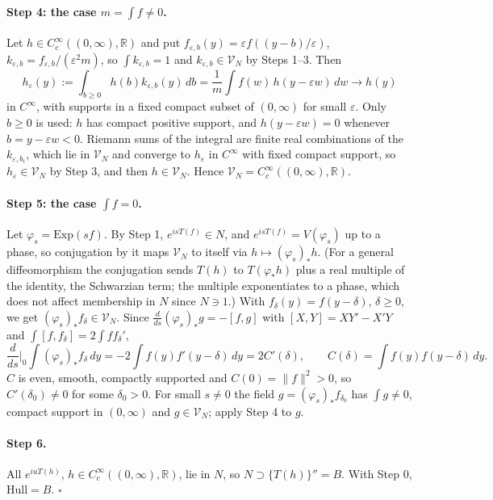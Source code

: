 \documentclass[12pt]{article}
\theoremstyle{definition}
\theoremstyle{remark}
\begin{document}
\paragraph{Step 4: the case \(m=\int f\ne0\).} Let \(h\in C_c^\infty((0,\infty),\mathbb R)\)
and put \(f_{\varepsilon,b}(y)=\varepsilon f((y-b)/\varepsilon)\), \(k_{\varepsilon,b}=f_{\varepsilon,b}/(\varepsilon^2m)\), so
\(\int k_{\varepsilon,b}=1\) and \(k_{\varepsilon,b}\in\mathcal V_N\) by Steps 1--3. Then
\[
h_\varepsilon(y):=\int_{b\ge0} h(b)k_{\varepsilon,b}(y)\,db=\frac1m\int f(w)\,h(y-\varepsilon w)\,dw\longrightarrow h(y)
\]
in \(C^\infty\), with supports in a fixed compact subset of \((0,\infty)\) for small
\(\varepsilon\). Only \(b\ge0\) is used: \(h\) has compact positive support, and
\(h(y-\varepsilon w)=0\) whenever \(b=y-\varepsilon w<0\).
Riemann sums of the integral are finite real combinations of the
\(k_{\varepsilon,b_i}\), which lie in \(\mathcal V_N\) and converge to \(h_\varepsilon\) in
\(C^\infty\) with fixed compact support, so \(h_\varepsilon\in\mathcal V_N\) by Step 3, and
then \(h\in\mathcal V_N\). Hence \(\mathcal V_N=C_c^\infty((0,\infty),\mathbb R)\).

\paragraph{Step 5: the case \(\int f=0\).} Let \(\varphi_s=\mathrm{Exp}(sf)\). By Step 1,
\(e^{isT(f)}\in N\), and \(e^{isT(f)}=V(\varphi_s)\) up to a phase, so conjugation by it
maps \(\mathcal V_N\) to itself via \(h\mapsto(\varphi_s)_*h\). (For a general diffeomorphism the conjugation
sends \(T(h)\) to \(T(\varphi_*h)\) plus a real multiple of the identity, the Schwarzian term; the
multiple exponentiates to a phase, which does not affect membership in \(N\) since \(N\ni1\).) With
\(f_\delta(y)=f(y-\delta)\), \(\delta\ge0\), we get \((\varphi_s)_*f_\delta\in\mathcal V_N\).
Since \(\tfrac d{ds}(\varphi_s)_*g=-[f,g]\) with \([X,Y]=XY'-X'Y\) and
\(\int[f,f_\delta]=2\int ff_\delta'\),
\[
\frac d{ds}\Big|_{0}\int(\varphi_s)_*f_\delta\,dy=-2\int f(y)f'(y-\delta)\,dy=2C'(\delta),
\qquad C(\delta)=\int f(y)f(y-\delta)\,dy .
\]
\(C\) is even, smooth, compactly supported and \(C(0)=\|f\|^2>0\), so \(C'(\delta_0)\ne0\)
for some \(\delta_0>0\). For small \(s\ne0\) the field \(g=(\varphi_s)_*f_{\delta_0}\) has
\(\int g\ne0\), compact support in \((0,\infty)\) and \(g\in\mathcal V_N\); apply Step 4 to \(g\).

\paragraph{Step 6.} All \(e^{iuT(h)}\), \(h\in C_c^\infty((0,\infty),\mathbb R)\), lie in \(N\), so
\(N\supset\{T(h)\}''=B\). With Step 0, \(\mathrm{Hull}=B\). \(\square\)
\end{document}
